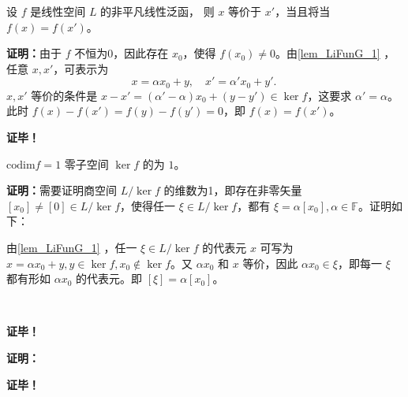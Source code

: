 \begin{corollary}{}
设 $f$ 是线性空间 $L$ 的非平凡线性泛函， 则 $x$ 等价于 $x'$，当且将当 $f(x)=f(x')$。
\end{corollary}
\textbf{证明：}由于 $f$ 不恒为0，因此存在 $x_0$，使得 $f(x_0)\neq0$。由\autoref{lem_LiFunG_1} ，任意 $x,x'$，可表示为
\begin{equation}
x=\alpha x_0+y,\quad x'=\alpha' x_0+y'.~
\end{equation}
$x,x'$ 等价的条件是 $x-x'=(\alpha'-\alpha)x_0+(y-y')\in \ker f$，这要求 $\alpha'=\alpha$。此时 $f(x)-f(x')=f(y)-f(y')=0$，即 $f(x)=f(x')$。

\textbf{证毕！}


\begin{corollary}{ $\mathrm{codim} f=1$ }
零子空间 $\ker f$ 的为 $1$。
\end{corollary}

\textbf{证明：}需要证明商空间 $L/\ker f$ 的维数为1，即存在非零矢量 $[x_0]\neq [0]\in L/\ker f$，使得任一 $\xi\in L/\ker f$，都有 $\xi=\alpha[x_0],\alpha\in\mathbb F$。证明如下：

由\autoref{lem_LiFunG_1} ，任一 $\xi\in L/\ker f$ 的代表元 $x$ 可写为 $x=\alpha x_0+y,y\in\ker f,x_0\notin\ker f$。又 $\alpha x_0$ 和 $x$ 等价，因此 $\alpha x_0\in \xi$，即每一 $\xi$ 都有形如 $\alpha x_0$ 的代表元。即 $[\xi]=\alpha[x_0]$。 


\

\textbf{证毕！}







\textbf{证明：}



\textbf{证毕！}







